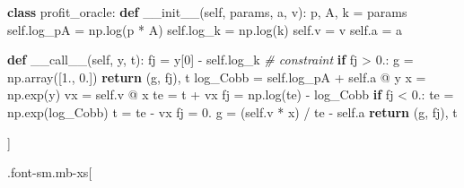 \documentclass[
]{article}
\newenvironment{Shaded}{}{}
\newcommand{\CommentTok}[1]{\textcolor[rgb]{0.38,0.63,0.69}{\textit{#1}}}
\newcommand{\ControlFlowTok}[1]{\textcolor[rgb]{0.00,0.44,0.13}{\textbf{#1}}}
\newcommand{\DecValTok}[1]{\textcolor[rgb]{0.25,0.63,0.44}{#1}}
\newcommand{\FloatTok}[1]{\textcolor[rgb]{0.25,0.63,0.44}{#1}}
\newcommand{\FunctionTok}[1]{\textcolor[rgb]{0.02,0.16,0.49}{#1}}
\newcommand{\KeywordTok}[1]{\textcolor[rgb]{0.00,0.44,0.13}{\textbf{#1}}}
\newcommand{\NormalTok}[1]{#1}
\newcommand{\OperatorTok}[1]{\textcolor[rgb]{0.40,0.40,0.40}{#1}}
\newcommand{\VariableTok}[1]{\textcolor[rgb]{0.10,0.09,0.49}{#1}}
\begin{document}
\begin{Shaded}
\begin{Highlighting}[]
\KeywordTok{class}\NormalTok{ profit\_oracle:}
    \KeywordTok{def} \FunctionTok{\_\_init\_\_}\NormalTok{(}\VariableTok{self}\NormalTok{, params, a, v):}
\NormalTok{        p, A, k }\OperatorTok{=}\NormalTok{ params}
        \VariableTok{self}\NormalTok{.log\_pA }\OperatorTok{=}\NormalTok{ np.log(p }\OperatorTok{*}\NormalTok{ A)}
        \VariableTok{self}\NormalTok{.log\_k }\OperatorTok{=}\NormalTok{ np.log(k)}
        \VariableTok{self}\NormalTok{.v }\OperatorTok{=}\NormalTok{ v}
        \VariableTok{self}\NormalTok{.a }\OperatorTok{=}\NormalTok{ a}

    \KeywordTok{def} \FunctionTok{\_\_call\_\_}\NormalTok{(}\VariableTok{self}\NormalTok{, y, t):}
\NormalTok{        fj }\OperatorTok{=}\NormalTok{ y[}\DecValTok{0}\NormalTok{] }\OperatorTok{{-}} \VariableTok{self}\NormalTok{.log\_k  }\CommentTok{\# constraint}
        \ControlFlowTok{if}\NormalTok{ fj }\OperatorTok{\textgreater{}} \FloatTok{0.}\NormalTok{:}
\NormalTok{            g }\OperatorTok{=}\NormalTok{ np.array([}\FloatTok{1.}\NormalTok{, }\FloatTok{0.}\NormalTok{])}
            \ControlFlowTok{return}\NormalTok{ (g, fj), t}
\NormalTok{        log\_Cobb }\OperatorTok{=} \VariableTok{self}\NormalTok{.log\_pA }\OperatorTok{+} \VariableTok{self}\NormalTok{.a }\OperatorTok{@}\NormalTok{ y}
\NormalTok{        x }\OperatorTok{=}\NormalTok{ np.exp(y)}
\NormalTok{        vx }\OperatorTok{=} \VariableTok{self}\NormalTok{.v }\OperatorTok{@}\NormalTok{ x}
\NormalTok{        te }\OperatorTok{=}\NormalTok{ t }\OperatorTok{+}\NormalTok{ vx}
\NormalTok{        fj }\OperatorTok{=}\NormalTok{ np.log(te) }\OperatorTok{{-}}\NormalTok{ log\_Cobb}
        \ControlFlowTok{if}\NormalTok{ fj }\OperatorTok{\textless{}} \FloatTok{0.}\NormalTok{:}
\NormalTok{            te }\OperatorTok{=}\NormalTok{ np.exp(log\_Cobb)}
\NormalTok{            t }\OperatorTok{=}\NormalTok{ te }\OperatorTok{{-}}\NormalTok{ vx}
\NormalTok{            fj }\OperatorTok{=} \FloatTok{0.}
\NormalTok{        g }\OperatorTok{=}\NormalTok{ (}\VariableTok{self}\NormalTok{.v }\OperatorTok{*}\NormalTok{ x) }\OperatorTok{/}\NormalTok{ te }\OperatorTok{{-}} \VariableTok{self}\NormalTok{.a}
        \ControlFlowTok{return}\NormalTok{ (g, fj), t}
\end{Highlighting}
\end{Shaded}

{]}

.font-sm.mb-xs{[}
\end{document}
